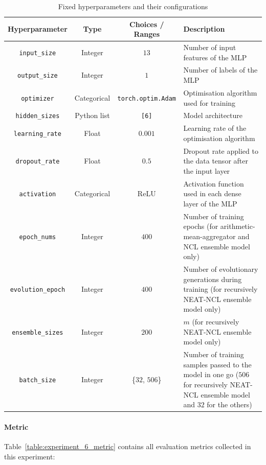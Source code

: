 \documentclass{article}
\begin{document}
\begin{table}[H]
    \centering
    \begin{tabular}{|c|c|c|p{7cm}|}
        \hline
        Hyperparameter & Type & Choices / Ranges & Description \\
        \hline
        \small\texttt{input\_size} & Integer & $13$ & Number of input features of the MLP \\
        \hline
        \small\texttt{output\_size} & Integer & $1$ & Number of labels of the MLP \\
        \hline
        \small\texttt{optimizer} & Categorical & \texttt{torch.optim.Adam} & Optimisation algorithm used for training \\
        \hline
        \small\texttt{hidden\_sizes} & Python list & \texttt{[6]} & Model architecture \\
        \hline
        \small\texttt{learning\_rate} & Float & $0.001$ & Learning rate of the optimisation algorithm \\
        \hline
        \small\texttt{dropout\_rate} & Float & $0.5$ & Dropout rate applied to the data tensor after the input layer \\
        \hline
        \small\texttt{activation} & Categorical & ReLU & Activation function used in each dense layer of the MLP \\
        \hline
        \small\texttt{epoch\_nums} & Integer & $400$ & Number of training epochs (for arithmetic-mean-aggregator and NCL ensemble model only) \\
        \hline
        \small\texttt{evolution\_epoch} & Integer & $400$ & Number of evolutionary generations during training (for recursively NEAT-NCL ensemble model only) \\
        \hline
        \small\texttt{ensemble\_sizes} & Integer & $200$ & $m$ (for recursively NEAT-NCL ensemble model only) \\
        \hline
        \small\texttt{batch\_size} & Integer & \{$32$, $506$\} & Number of training samples passed to the model in one go ($506$ for recursively NEAT-NCL ensemble model and $32$ for the others) \\
        \hline
    \end{tabular}
    \caption{Fixed hyperparameters and their configurations}
    \label{table:experiment_6_fixed_hyperparameters}
\end{table}

\paragraph{Metric}
Table~\ref{table:experiment_6_metric} contains all evaluation metrics collected in this experiment: 
\end{document}
